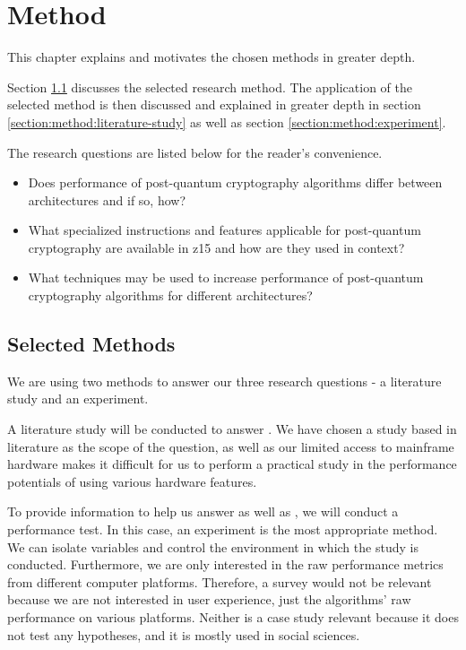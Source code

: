 \chapter{Method}
\label{chapter:method}

This chapter explains and motivates the chosen methods in greater depth.

Section \ref{section:method:selected-method} discusses the selected research method. The application of the selected method is then discussed and explained in greater depth in section \ref{section:method:literature-study} as well as section \ref{section:method:experiment}.

The research questions are listed below for the reader's convenience.

\begin{itemize}
    \item Does performance of \gls{post-quantum} cryptography algorithms differ between architectures and if so, how?
    \item What specialized instructions and features applicable for \gls{post-quantum} cryptography are available in \gls{z15} and how are they used in context?
    \item What techniques may be used to increase performance of \gls{post-quantum} cryptography algorithms for different architectures?
\end{itemize}

\section{Selected Methods}
\label{section:method:selected-method}

We are using two methods to answer our three research questions - a literature study and an experiment.

A literature study will be conducted to answer . We have chosen a study based in literature as the scope of the question, as well as our limited access to mainframe hardware makes it difficult for us to perform a practical study in the performance potentials of using various hardware features.

To provide information to help us answer  as well as , we will conduct a performance test. In this case, an experiment is the most appropriate method. We can isolate variables and control the environment in which the study is conducted. Furthermore, we are only interested in the raw performance metrics from different computer platforms. Therefore, a survey would not be relevant because we are not interested in user experience, just the algorithms' raw performance on various platforms. Neither is a case study relevant because it does not test any hypotheses, and it is mostly used in social sciences\cite{wohlin2012}.

